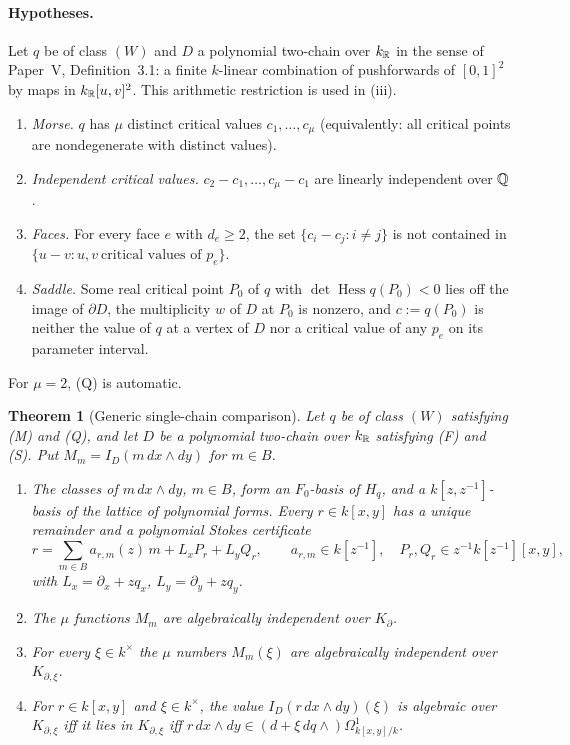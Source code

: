 \documentclass[11pt]{article}
\numberwithin{equation}{section}
\newtheorem{theorem}{Theorem}[section]
\theoremstyle{definition}
\theoremstyle{remark}
\newcommand{\Hq}{H_q}
\newcommand{\dd}{\,d}
\begin{document}
\paragraph{Hypotheses.} Let $q$ be of class $(W)$ and $D$ a polynomial two-chain
over $k_\mathbb R$ in the sense of Paper~V, Definition~3.1: a finite $k$-linear
combination of pushforwards of $[0,1]^2$ by maps in $k_\mathbb R[u,v]^2$. This
arithmetic restriction is used in (iii).
\begin{enumerate}[label=\textup{(\Alph*)},leftmargin=2.6em]
\item[(M)] \emph{Morse.} $q$ has $\mu$ distinct critical values
 $c_1,\dots,c_\mu$ (equivalently: all critical points are nondegenerate with
 distinct values).
\item[(Q)] \emph{Independent critical values.} $c_2-c_1,\dots,c_\mu-c_1$ are
 linearly independent over $\mathbb Q$.
\item[(F)] \emph{Faces.} For every face $e$ with $d_e\ge2$, the set
 $\{c_i-c_j:i\ne j\}$ is not contained in
 $\{u-v: u,v\ \text{critical values of }p_e\}$.
\item[(S)] \emph{Saddle.} Some real critical point $P_0$ of $q$ with
 $\det\operatorname{Hess}q(P_0)<0$ lies off the image of $\partial D$, the
 multiplicity $w$ of $D$ at $P_0$ is nonzero, and $c:=q(P_0)$ is neither the
 value of $q$ at a vertex of $D$ nor a critical value of any $p_e$ on its
 parameter interval.
\end{enumerate}
For $\mu=2$, (Q) is automatic.

\begin{theorem}[Generic single-chain comparison]\label{thm:main}
Let $q$ be of class $(W)$ satisfying \textup{(M)} and \textup{(Q)}, and let $D$
be a polynomial two-chain over $k_\mathbb R$ satisfying \textup{(F)} and \textup{(S)}. Put
$M_m=I_D(m\dd x\wedge dy)$ for $m\in B$.
\begin{enumerate}[label=\textup{(\roman*)},leftmargin=2.4em]
\item The classes of $m\,dx\wedge dy$, $m\in B$, form an $F_0$-basis of $\Hq$,
 and a $k[z,z^{-1}]$-basis of the lattice of polynomial forms. Every
 $r\in k[x,y]$ has a unique remainder and a polynomial Stokes certificate
 \[
  r=\sum_{m\in B}a_{r,m}(z)\,m+L_xP_r+L_yQ_r,\qquad a_{r,m}\in k[z^{-1}],\quad
  P_r,Q_r\in z^{-1}k[z^{-1}][x,y],
 \]
 with $L_x=\partial_x+zq_x$, $L_y=\partial_y+zq_y$.
\item The $\mu$ functions $M_m$ are algebraically independent over $K_\partial$.
\item For every $\xi\in k^\times$ the $\mu$ numbers $M_m(\xi)$ are algebraically
 independent over $K_{\partial,\xi}$.
\item For $r\in k[x,y]$ and $\xi\in k^\times$, the value $I_D(r\dd x\wedge dy)(\xi)$
 is algebraic over $K_{\partial,\xi}$ iff it lies in $K_{\partial,\xi}$ iff
 $r\,dx\wedge dy\in(d+\xi\,dq\wedge)\Omega^1_{k[x,y]/k}$.
\end{enumerate}
\end{theorem}
\end{document}
